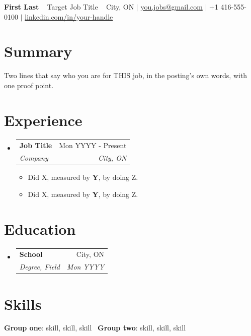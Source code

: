 \documentclass[letterpaper,11pt]{article}
\makeatletter
\newcommand{\resumeItem}[1]{\item\small{#1\vspace{-2pt}}}
\newcommand{\resumeSubheading}[4]{
  \vspace{-1pt}\item
    \begin{tabular*}{0.97\textwidth}[t]{l@{\extracolsep{\fill}}r}
      \textbf{#1} & #2 \\
      \textit{\small#3} & \textit{\small #4} \\
    \end{tabular*}\vspace{-6pt}}
\newcommand{\resumeSubHeadingListStart}{\begin{itemize}[leftmargin=0.15in, label={}]}
\newcommand{\resumeSubHeadingListEnd}{\end{itemize}}
\newcommand{\resumeItemListStart}{\begin{itemize}}
\newcommand{\resumeItemListEnd}{\end{itemize}\vspace{1pt}}
\makeatother
\begin{document}
\begin{center}
  {\Huge \bfseries First Last} \ \vspace{3pt}
  {\large Target Job Title} \ \vspace{2pt}
  \small City, ON $|$ \href{mailto:you.jobs@gmail.com}{you.jobs@gmail.com} $|$ +1 416-555-0100 $|$
  \href{https://www.linkedin.com/in/your-handle/}{linkedin.com/in/your-handle}
\end{center}

\section{Summary}
\small{Two lines that say who you are for THIS job, in the posting's own words, with one proof point.}

\section{Experience}
\resumeSubHeadingListStart
  \resumeSubheading{Job Title}{Mon YYYY - Present}{Company}{City, ON}
  \resumeItemListStart
    \resumeItem{Did X, measured by \textbf{Y}, by doing Z.}
    \resumeItem{Did X, measured by \textbf{Y}, by doing Z.}
  \resumeItemListEnd
\resumeSubHeadingListEnd

\section{Education}
\resumeSubHeadingListStart
  \resumeSubheading{School}{City, ON}{Degree, Field}{Mon YYYY}
\resumeSubHeadingListEnd

\section{Skills}
\begin{itemize}[leftmargin=0.15in, label={}]
  \small{\item{
    \textbf{Group one}{: skill, skill, skill} \
    \textbf{Group two}{: skill, skill, skill}
  }}
\end{itemize}
\end{document}
